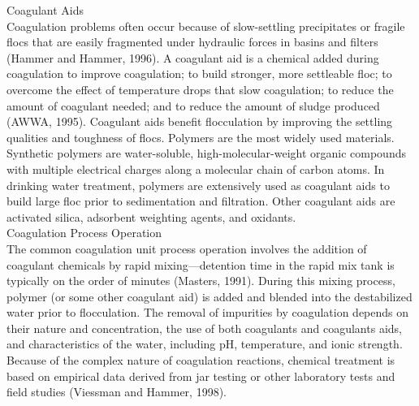 \documentclass{article}
\begin{document}
Coagulant Aids\\
Coagulation problems often occur because of slow-settling precipitates or fragile flocs that are easily fragmented under hydraulic forces in basins and filters (Hammer and Hammer, 1996). A coagulant aid is a chemical added during coagulation to improve coagulation; to build stronger, more settleable floc; to overcome the effect of temperature drops that slow coagulation; to reduce the amount of coagulant needed; and to reduce the amount of sludge produced (AWWA, 1995). Coagulant aids benefit
flocculation by improving the settling qualities and toughness of flocs. Polymers are the most widely used materials. Synthetic polymers are water-soluble, high-molecular-weight organic compounds with multiple electrical charges along a molecular chain of carbon atoms. In drinking water treatment, polymers are extensively used as coagulant aids to build large floc prior to sedimentation and filtration. Other coagulant aids are activated silica, adsorbent weighting agents, and oxidants.\\

Coagulation Process Operation\\
The common coagulation unit process operation involves the addition of coagulant chemicals by rapid mixing—detention time in the rapid mix tank is typically on the order of minutes (Masters, 1991). During this mixing process, polymer (or some other coagulant aid) is added and blended into the destabilized water prior to flocculation. The removal of impurities by coagulation depends on their nature and concentration, the use of both coagulants and coagulants aids, and characteristics of the water, including pH, temperature, and ionic strength. Because of the complex nature of coagulation reactions, chemical treatment is based on empirical data derived from jar testing or other laboratory tests and field studies (Viessman and Hammer, 1998).\\
\end{document}
